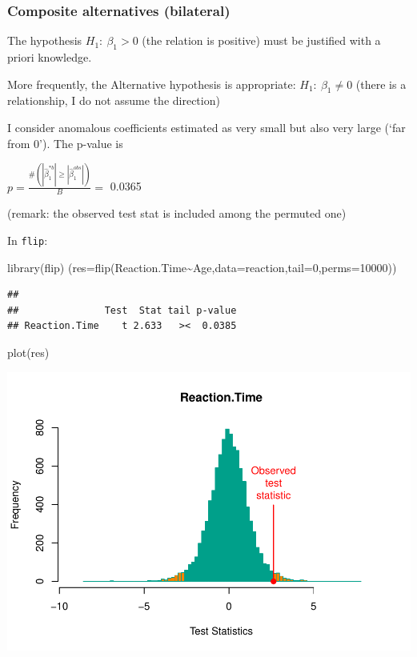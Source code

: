 \documentclass[
]{article}
\newenvironment{Shaded}{\begin{snugshade}}{\end{snugshade}}
\newcommand{\AttributeTok}[1]{\textcolor[rgb]{0.77,0.63,0.00}{#1}}
\newcommand{\DecValTok}[1]{\textcolor[rgb]{0.00,0.00,0.81}{#1}}
\newcommand{\FunctionTok}[1]{\textcolor[rgb]{0.00,0.00,0.00}{#1}}
\newcommand{\NormalTok}[1]{#1}
\newcommand{\SpecialCharTok}[1]{\textcolor[rgb]{0.00,0.00,0.00}{#1}}
\begin{document}
\hypertarget{composite-alternatives-bilateral}{%
\subsubsection{Composite alternatives
(bilateral)}\label{composite-alternatives-bilateral}}

The hypothesis \(H_1: \ \beta_1 >0\) (the relation is positive) must be
justified with a priori knowledge.

More frequently, the Alternative hypothesis is appropriate:
\(H_1: \ \beta_1 \neq 0\) (there is a relationship, I do not assume the
direction)

I consider anomalous coefficients estimated as very small but also very
large (`far from 0'). The p-value is

\(p=\frac{\#(|\hat{\beta}_1^{*b} | \geq|\hat{\beta}_1^{obs}|)}{B}=\)
0.0365

(remark: the observed test stat is included among the permuted one)

In \texttt{flip}:

\begin{Shaded}
\begin{Highlighting}[]
\FunctionTok{library}\NormalTok{(flip)}
\NormalTok{(}\AttributeTok{res=}\FunctionTok{flip}\NormalTok{(Reaction.Time}\SpecialCharTok{\textasciitilde{}}\NormalTok{Age,}\AttributeTok{data=}\NormalTok{reaction,}\AttributeTok{tail=}\DecValTok{0}\NormalTok{,}\AttributeTok{perms=}\DecValTok{10000}\NormalTok{))}
\end{Highlighting}
\end{Shaded}

\begin{verbatim}
## 
##               Test  Stat tail p-value
## Reaction.Time    t 2.633   ><  0.0385
\end{verbatim}

\begin{Shaded}
\begin{Highlighting}[]
\FunctionTok{plot}\NormalTok{(res)}
\end{Highlighting}
\end{Shaded}

\begin{center}\includegraphics{perm_files/figure-latex/unnamed-chunk-17-1} \end{center}
\end{document}
